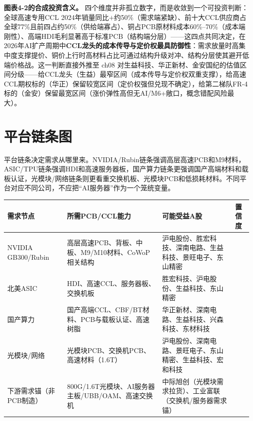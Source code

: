 \textbf{图表4-2的合成投资含义。} 四个维度并非孤立数字，而是收敛到一个可投资判断：全球高速专用CCL 2024年销量同比$+$约50\%（需求端紧缺）、前十大CCL供应商占全球77\%且前四占约50\%（供给端寡占）、铜占PCB原材料成本60\%--70\%（成本端刚性）、高端HDI毛利显著高于标准PCB（结构端分层）——这四点共同决定，在2026年AI扩产周期中\textbf{CCL龙头的成本传导与定价权最具防御性}：需求放量时高集中度支撑提价、铜价上行时高材料占比可通过结构升级对冲、结构分层使其避开低端价格战。这一判断直接外推至 ch08 对生益科技、华正新材、金安国纪的估值区间分级——给CCL龙头（生益）最窄区间（成本传导与定价权双重支撑），给高速CCL期权标的（华正）保留较宽区间（定价权强但兑现不确定），给第二梯队FR-4标的（金安）保留最宽区间（涨价弹性高但无AI/M6+敞口，概念错配风险最大）。

\section{平台链条图}

平台链条决定需求从哪里来。NVIDIA/Rubin链条强调高层高速PCB和M9材料，ASIC/TPU链条强调HDI和高速服务器板，国产算力链条更强调国产高端材料和载板认证，光模块/网络链条则更看重交换机板、光模块PCB和低损耗材料。不同平台对应不同公司，不应把“AI服务器”作为一个笼统变量。

\begin{exhibitbox}[图表4-3：需求平台到A股暴露]
\footnotesize
\begin{tabularx}{\textwidth}{L{3cm}L{4.2cm}L{4.8cm}L{2.5cm}}
\toprule
\textbf{需求节点} & \textbf{所需PCB/CCL能力} & \textbf{可能受益A股} & \textbf{置信度} \\
\midrule
NVIDIA GB300/Rubin & 高层高速PCB、背板、中板、M9/M10材料、CoWoP相关结构 & 沪电股份、胜宏科技、深南电路、生益科技、景旺电子、东山精密 &  \\
北美ASIC & HDI、高速CCL、服务器板、交换机板 & 胜宏科技、沪电股份、生益科技、东山精密 &  \\
国产算力 & 国产高端CCL、CBF/BT材料、PCB与载板认证、高速树脂 & 华正新材、深南电路、生益科技、兴森科技、东材科技 &  \\
光模块/网络 & 光模块PCB、交换机PCB、高速材料（1.6T） & 沪电股份、深南电路、景旺电子、东山精密、生益科技、宏和科技 &  \\
下游需求锚（非PCB制造） & 800G/1.6T光模块、AI服务器主板/UBB/OAM、高速交换机 & 中际旭创（光模块需求拉货）、工业富联（交换机/服务器需求锚） &  \\
\bottomrule
\end{tabularx}
\end{exhibitbox}

